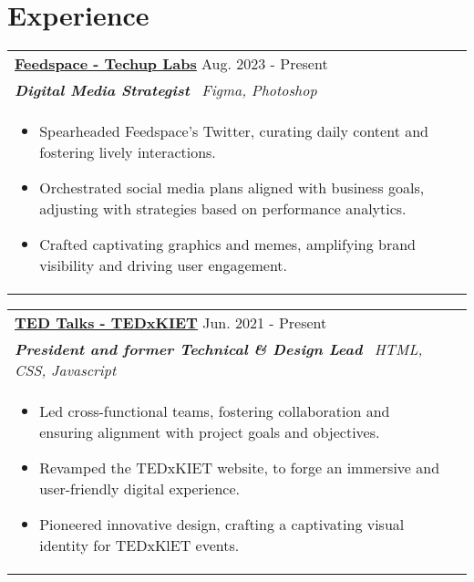 \documentclass[a4paper,8pt]{article}
\begin{document}
\section{Experience}
\begin{tabularx}{\linewidth}{ @{}l r@{} }
\textbf{\uline{\href{https://github.com/}{Feedspace - Techup Labs}}} \hfill \color[HTML]{371e77} Aug. 2023 - Present \\[4pt]
\color[HTML]{371e77}\textbf{\textit{Digital Media Strategist}}\ \hfill \color[HTML]{4B28A4} \textit{Figma, Photoshop} \\[5pt]
\begin{minipage}[t]{\linewidth}
    \begin{itemize}[nosep,after=\strut, leftmargin=2em, itemsep=2pt]
        \item Spearheaded Feedspace's Twitter, curating daily content and fostering lively interactions.
        \item Orchestrated social media plans aligned with business goals, adjusting with strategies based on performance analytics.
        \item Crafted captivating graphics and memes, amplifying brand visibility and driving user engagement.
    \end{itemize}
\end{minipage}
\end{tabularx}

\begin{tabularx}{\linewidth}{ @{}l r@{} }
\color[HTML]{1C033C} \textbf{\uline{\href{https://github.com/}{TED Talks - TEDxKIET}}} \hfill \color[HTML]{371e77} Jun. 2021 - Present \\[4pt]
\color[HTML]{371e77}\textbf{\textit{President and former Technical \& Design Lead}}\ \hfill \color[HTML]{4B28A4} \textit{HTML, CSS, Javascript} \\[5pt]
\begin{minipage}[t]{\linewidth}
    \begin{itemize}[nosep,after=\strut, leftmargin=2em, itemsep=2pt]
        \item Led cross-functional teams, fostering collaboration and ensuring alignment with project goals and objectives.
        \item Revamped the TEDxKIET website, to forge an immersive and user-friendly digital experience.
        \item Pioneered innovative design, crafting a captivating visual identity for TEDxKlET events.

    \end{itemize}
\end{minipage}
\end{tabularx}
\end{document}
